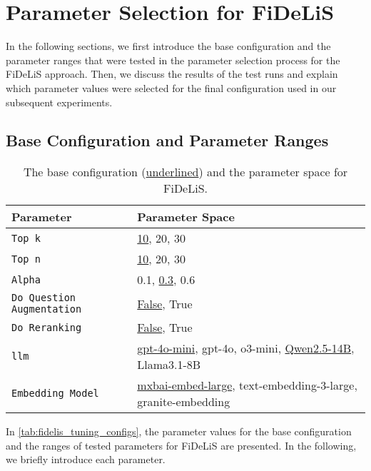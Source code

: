 

\section{Parameter Selection for FiDeLiS}
\label{sec:param_selection_fidelis}

In the following sections, we first introduce the base configuration and the parameter ranges that were tested in the parameter selection process for the FiDeLiS approach. Then, we discuss the results of the test runs and explain which parameter values were selected for the final configuration used in our subsequent experiments.

\subsection{Base Configuration and Parameter Ranges}
\begin{table}[t]
    \centering
    \begin{tabularx}{\textwidth}{l X}
        \toprule
        \textbf{Parameter} & \textbf{Parameter Space} \\
        \midrule
        \texttt{Top k} & \underline{10}, 20, 30 \\
        \texttt{Top n} & \underline{10}, 20, 30 \\
        \texttt{Alpha} & 0.1, \underline{0.3}, 0.6 \\
        \texttt{Do Question Augmentation} & \underline{False}, True \\
        \texttt{Do Reranking} & \underline{False}, True \\
        \texttt{\gls{llm}} & \underline{gpt-4o-mini}, gpt-4o, o3-mini, \underline{Qwen2.5-14B}, Llama3.1-8B \\
        \texttt{Embedding Model} & \underline{mxbai-embed-large}, text-embedding-3-large, \newline granite-embedding \\
        \bottomrule
    \end{tabularx}
    \caption[Base Configuration and Parameter Space for FiDeLiS]{The base configuration (\underline{underlined}) and the parameter space for FiDeLiS.}
    \label{tab:fidelis_tuning_configs}
\end{table}


In \autoref{tab:fidelis_tuning_configs}, the parameter values for the base configuration and the ranges of tested parameters for FiDeLiS are presented. In the following, we briefly introduce each parameter.

